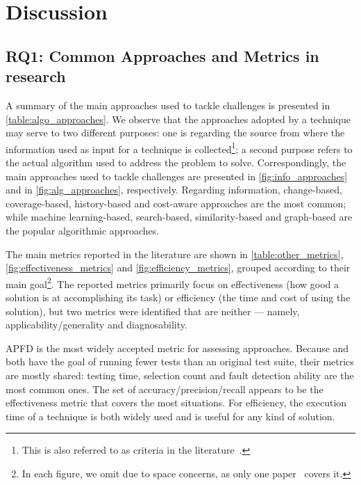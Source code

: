 \section{Discussion}\label{sec:lit_discussion}

\subsection{RQ1: Common Approaches and Metrics in \rt research}
\label{sec:lit_rq1}

A summary of the main approaches used to tackle \rt challenges is presented in \autoref{table:algo_approaches}.
We observe that the approaches adopted by a technique may serve to two different purposes:
one is regarding the source from where the information used as input for a technique is collected\footnote{This is also referred to as criteria in the literature~\citep{lou_survey_2018}.}; a second purpose refers to the actual algorithm used to address the problem to solve.
Correspondingly, the main approaches used to tackle \rt challenges are presented in \autoref{fig:info_approaches} and in \autoref{fig:alg_approaches}, respectively.
Regarding information, change-based, coverage-based, history-based and cost-aware approaches are the most common; while machine learning-based, search-based, similarity-based and graph-based are the popular algorithmic approaches.

%

The main metrics reported in the literature are shown in \autoref{table:other_metrics}, \autoref{fig:effectiveness_metrics} and \autoref{fig:efficiency_metrics}, grouped according to their main goal\footnote{In each figure, we omit \tsa due to space concerns, as only one paper~ covers it.}.
The reported metrics primarily focus on effectiveness (how good a solution is at accomplishing its task) or efficiency (the time and cost of using the solution), but two metrics were identified that are neither --- namely, applicability/generality and diagnosability.

APFD is the most widely accepted metric for assessing \tcp{} approaches.
Because \tcs and \tsr both have the goal of running fewer tests than an original test suite, their metrics are mostly shared: testing time, selection count and fault detection ability are the most common ones.
The set of accuracy/precision/recall appears to be the effectiveness metric that covers the most situations.
For efficiency, the execution time of a technique is both widely used and is useful for any kind of solution.

